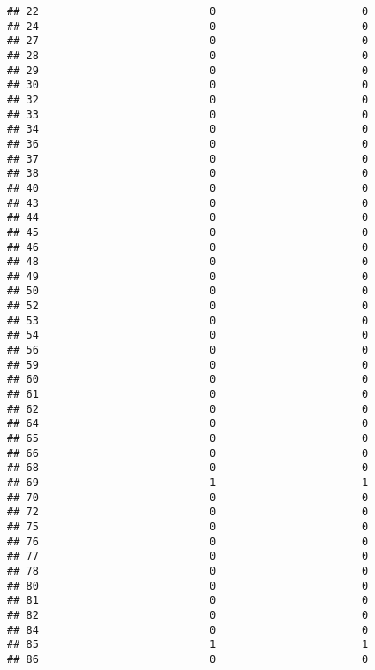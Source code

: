 \documentclass[
]{article}
\begin{document}
\begin{verbatim}
## 22                           0                       0
## 24                           0                       0
## 27                           0                       0
## 28                           0                       0
## 29                           0                       0
## 30                           0                       0
## 32                           0                       0
## 33                           0                       0
## 34                           0                       0
## 36                           0                       0
## 37                           0                       0
## 38                           0                       0
## 40                           0                       0
## 43                           0                       0
## 44                           0                       0
## 45                           0                       0
## 46                           0                       0
## 48                           0                       0
## 49                           0                       0
## 50                           0                       0
## 52                           0                       0
## 53                           0                       0
## 54                           0                       0
## 56                           0                       0
## 59                           0                       0
## 60                           0                       0
## 61                           0                       0
## 62                           0                       0
## 64                           0                       0
## 65                           0                       0
## 66                           0                       0
## 68                           0                       0
## 69                           1                       1
## 70                           0                       0
## 72                           0                       0
## 75                           0                       0
## 76                           0                       0
## 77                           0                       0
## 78                           0                       0
## 80                           0                       0
## 81                           0                       0
## 82                           0                       0
## 84                           0                       0
## 85                           1                       1
## 86                           0                       0

\end{verbatim}
\end{document}

